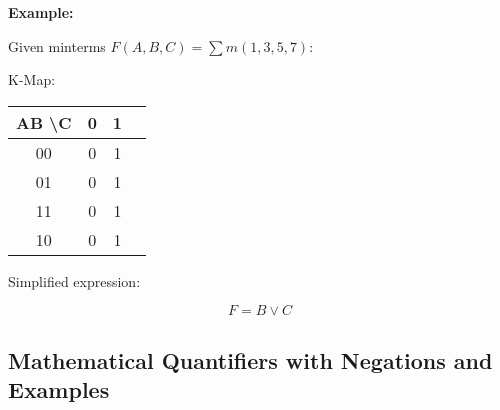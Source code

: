 \textbf{Example:}

Given minterms $F(A, B, C) = \sum m(1, 3, 5, 7)$:

\begin{multicols}{2}
	K-Map:

	\begin{center}
		\begin{tabular}{|c|c|c|c|}
			\hline
			AB \textbackslash C & 0 & 1 \\
			\hline
			00                  & 0 & 1 \\
			01                  & 0 & 1 \\
			11                  & 0 & 1 \\
			10                  & 0 & 1 \\
			\hline
		\end{tabular}
	\end{center}

	\columnbreak

	Simplified expression:

	\[
		F = B \lor C
	\]
\end{multicols}

\subsection{Mathematical Quantifiers with Negations and Examples}

